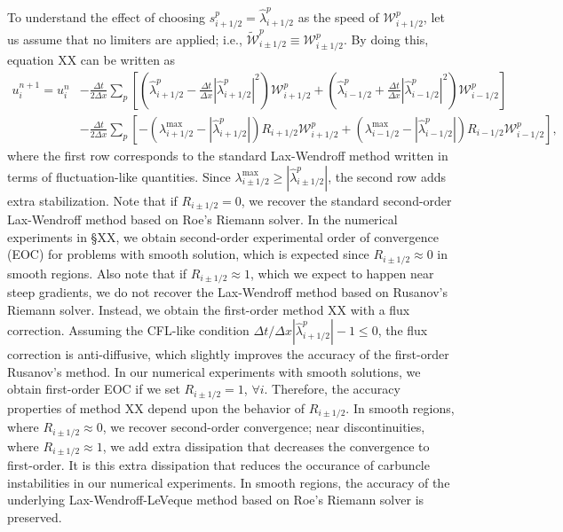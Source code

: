 \documentclass[preprint, 11pt]{article}
\newcommand{\W}{{\mathcal W}}
\begin{document}
To understand the effect of choosing $s_{i+1/2}^p=\hat\lambda_{i+1/2}^p$ as the speed of $\W_{i+1/2}^p$, 
let us assume that no limiters are applied; i.e., $\tilde\W_{i\pm 1/2}^p\equiv \W_{i\pm 1/2}^p$.
By doing this, equation XX can be written as 
\begin{align*}
  u_i^{n+1}=u_i^n
  &-\frac{\Delta t}{2 \Delta x}
  \sum_p
  \left[\left(\hat\lambda_{i+1/2}^p -\frac{\Delta t}{\Delta x}|\hat\lambda_{i+1/2}^p|^2 \right)\W_{i+1/2}^p
  +
  \left(\hat\lambda_{i-1/2}^p +\frac{\Delta t}{\Delta x}|\hat\lambda_{i-1/2}^p|^2 \right)\W_{i-1/2}^p\right] \\
  &-\frac{\Delta t}{2\Delta x}
  \sum_p 
  \left[-\left(\lambda_{i+1/2}^{\max}-|\hat\lambda_{i+1/2}^p|\right)R_{i+1/2}\W_{i+1/2}^p
    +\left(\lambda_{i-1/2}^{\max}-|\hat\lambda_{i-1/2}^p|\right)R_{i-1/2}\W_{i-1/2}^p\right],
\end{align*}
where the first row corresponds to the standard Lax-Wendroff method written in terms of 
fluctuation-like quantities. 
Since $\lambda_{i\pm1/2}^{\max}\geq |\hat\lambda_{i\pm1/2}^p|$, 
the second row adds extra stabilization.
Note that if $R_{i\pm 1/2}=0$, we recover the standard second-order Lax-Wendroff method based on 
Roe's Riemann solver. 
In the numerical experiments in \S XX, we obtain second-order experimental 
order of convergence (EOC) for problems with smooth solution, which is expected since 
$R_{i\pm 1/2}\approx 0$ in smooth regions.
Also note that if $R_{i\pm 1/2}\approx 1$, which we expect to happen near steep gradients, 
we do not recover the Lax-Wendroff method based on Rusanov's Riemann solver. 
Instead, we obtain the first-order method XX with a flux correction. Assuming 
the CFL-like condition $\Delta t/\Delta x|\hat\lambda_{i+1/2}^p|-1\leq 0$, the flux correction is anti-diffusive, 
which slightly improves the accuracy of the first-order Rusanov's method. 
In our numerical experiments 
with smooth solutions, we obtain first-order EOC if we set $R_{i\pm1/2}=1$, $\forall i$. 
%
Therefore, the accuracy properties of method XX depend upon the behavior of $R_{i\pm 1/2}$. 
In smooth regions, where $R_{i\pm 1/2}\approx 0$, we recover second-order convergence;
near discontinuities, where $R_{i\pm 1/2}\approx 1$, we add extra dissipation that decreases the convergence 
to first-order. It is this extra dissipation that reduces the occurance of carbuncle instabilities 
in our numerical experiments. In smooth regions, the accuracy of the underlying Lax-Wendroff-LeVeque method 
based on Roe's Riemann solver is preserved.
\end{document}
